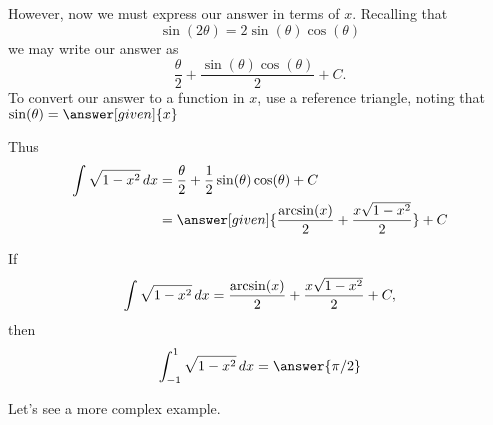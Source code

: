 \documentclass{ximera}
\begin{document}
\begin{example}
\begin{explanation}
    However, now we must express our answer in terms of $x$. Recalling that
    \[
    \sin(2\theta) = 2\sin(\theta)\cos(\theta)
    \]
    we may write our answer as
    \[
    \frac{\theta}{2} +\frac{\sin(\theta)\cos(\theta)}{2}+C.
    \]
    To convert our answer to a function in $x$, use a reference triangle, noting that $\sin(\theta) = \answer[given]{x}$
    \begin{image}
    \end{image}
    Thus
    \begin{align*}
      \int \sqrt{1-x^2} \d x &= \frac{\theta}{2} +\frac{1}{2}\sin(\theta)\cos(\theta)+C \\
      &= \answer[given]{\frac{\arcsin(x)}{2} + \frac{x\sqrt{1-x^2}}{2}} + C 
    \end{align*}
  \end{explanation}
\end{example}

\begin{question}
  If
  \[
  \int \sqrt{1-x^2} \mathop{}\!d x = \frac{\arcsin(x)}{2} + \frac{x\sqrt{1-x^2}}{2} + C,
  \]
  then
  \[
  \int_{-1}^{1}\sqrt{1-x^2} \d x = \answer{\pi/2}
  \]
\end{question}


Let's see a more complex example.
\end{document}
